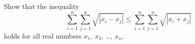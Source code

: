 Show that the inequality
\[\sum_{i=1}^n \sum_{j=1}^n \sqrt{|x_i-x_j|}
  \le \sum_{i=1}^n \sum_{j=1}^n \sqrt{|x_i+x_j|} \]
holds for all real numbers $x_1$, $x_2$, \dots, $x_n$.